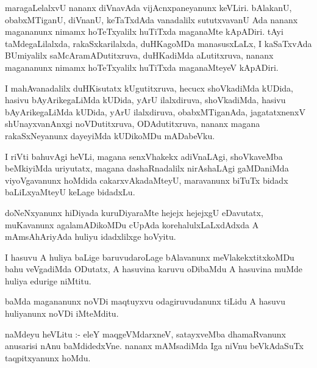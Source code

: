 \documentclass{article}
\begin{document}
\begin{mn}
maragaLelalxvU  nananx  diVnavAda  vijAcnxpaneyanunx  keVLiri.  bAlakanU,  
obabxMTiganU,  diVnanU,  keTaTxdAda  vanadalilx  sututxvavanU  Ada  nananx  
magananunx  nimamx  hoTeTxyalilx  huTiTxda  maganaMte  kApADiri.  tAyi  
taMdegaLilalxda,  rakaSxkarilalxda,  duHKagoMDa  manasusxLaLx,  I  kaSaTxvAda  
BUmiyalilx  saMcAramADutitxruva,  duHKadiMda  aLutitxruva,  nananx  magananunx  
nimamx  hoTeTxyalilx  huTiTxda  maganaMteyeV  kApADiri.
\end{mn}

\begin{mn}
I  mahAvanadalilx  duHKisutatx  kUgutitxruva,  hecucx shoVkadiMda  kUDida,  
hasivu  bAyArikegaLiMda  kUDida,  yArU  ilalxdiruva,  shoVkadiMda,  hasivu  
bAyArikegaLiMda  kUDida,  yArU  ilalxdiruva,  obabxMTiganAda,  jagatatxnenxV  
shUnayxvanAnxgi  noVDutitxruva,  ODAdutitxruva,  nananx  magana  rakaSxNeyanunx  
dayeyiMda  kUDikoMDu  mADabeVku.
\end{mn}

\begin{mn}
I  riVti  bahuvAgi  heVLi,  magana  senxVhakekx  adiVnaLAgi,  shoVkaveMba  beMkiyiMda  
uriyutatx,  magana  dashaRnadalilx  nirAshaLAgi  gaMDaniMda  viyoVgavanunx  hoMdida  
cakarxvAkadaMteyU,  maravanunx  biTuTx  bidadx  baLiLxyaMteyU  keLage  bidadxLu.
\end{mn}

\begin{mn}
doNeNxyanunx  hiDiyada  kuruDiyaraMte  hejejx hejejxgU  eDavutatx,  muKavanunx  
agalamADikoMDu  cUpAda  korehalulxLaLxdAdxda  A  mAmsAhAriyAda  huliyu  idadxlilxge  hoVyitu.  
\end{mn}

\begin{mn}
I hasuvu A  huliya  baLige  baruvudaroLage  bAlavanunx  meVlakekxtitxkoMDu  bahu  veVgadiMda  
ODutatx, A  hasuvina  karuvu  oDibaMdu  A  hasuvina  muMde  huliya  edurige  niMtitu.
\end{mn}

\begin{mn}
baMda  magananunx  noVDi  maqtuyxvu  odagiruvudanunx  tiLidu  A hasuvu  huliyanunx  noVDi  iMteMditu. 
\end{mn}

\begin{mn}
naMdeyu  heVLitu :- eleY  maqgeVMdarxneV,  satayxveMba  dhamaRvanunx  anusarisi  
nAnu  baMdidedxVne.  nananx  mAMsadiMda  Iga  niVnu  beVkAdaSuTx  taqpitxyanunx  hoMdu.
\end{mn}
\end{document}
